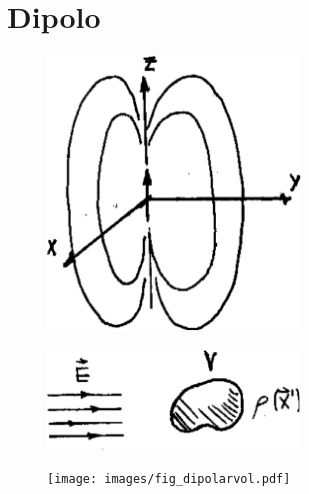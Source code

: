 \documentclass[10pt,oneside]{CBFT_book}
\begin{document}
\section{Dipolo}

\begin{figure}[htb]
	\begin{center}
	\includegraphics[width=0.6\textwidth]{images/fig_ft1_dipolar2.pdf}	 
	\end{center}
	\caption{}
\end{figure}

\begin{figure}[htb]
	\begin{center}
	\includegraphics[width=0.6\textwidth]{images/fig_ft1_dipolar3.pdf}	 
	\end{center}
	\caption{}
\end{figure}


\begin{figure}[htb]
	\begin{center}
	\texttt{[image: images/fig\_dipolarvol.pdf]}	 
	\end{center}
	\caption{}
\end{figure} 
\end{document}
